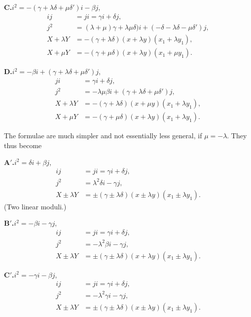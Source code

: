 \documentclass[12pt,a4paper]{article}
\begin{document}
\medskip
\textbf{C.}\quad $i^2 = -(\gamma + \lambda\delta + \mu\delta') i - \beta j$,
\begin{align*}
ij &= ji = \gamma i + \delta j,\\
j^2 &= (\lambda + \mu)\gamma + \lambda\mu\delta) i + (-\delta - \lambda\delta - \mu\delta')j,\\
X + \lambda Y &= -(\gamma + \lambda\delta)(x + \lambda y)(x_1 + \lambda y_1),\\
X + \mu Y &= -(\gamma + \mu\delta)(x + \lambda y)(x_1 + \mu y_1).
\end{align*}

\medskip
\textbf{D.}\quad $i^2 = -\beta i + (\gamma + \lambda\delta + \mu\delta')j$,
\begin{align*}
ji &= \gamma i + \delta j,\\
j^2 &= -\lambda\mu\beta i + (\gamma + \lambda\delta + \mu\delta')j,\\
X + \lambda Y &= -(\gamma + \lambda\delta)(x + \mu y)(x_1 + \lambda y_1),\\
X + \mu Y &= -(\gamma + \mu\delta)(x + \lambda y)(x_1 + \lambda y_1).
\end{align*}

\newpage
\setcounter{page}{130}

The formulae are much simpler and not essentially less general, if $\mu = -\lambda$. They
thus become

\medskip
\textbf{A$'$.}\quad $i^2 = \delta i + \beta j$,
\begin{align*}
ij &= ji = \gamma i + \delta j,\\
j^2 &= \lambda^2\delta i - \gamma j,\\
X \pm \lambda Y &= \pm (\gamma \pm \lambda\delta)(x \pm \lambda y)(x_1 \pm \lambda y_1).
\end{align*}
(Two linear moduli.)

\medskip
\textbf{B$'$.}\quad $i^2 = -\beta i - \gamma j$,
\begin{align*}
ij &= ji = \gamma i + \delta j,\\
j^2 &= -\lambda^2\beta i - \gamma j,\\
X \pm \lambda Y &= \pm (\gamma \pm \lambda\delta)(x + \lambda y)(x_1 \pm \lambda y_1).
\end{align*}

\medskip
\textbf{C$'$.}\quad $i^2 = -\gamma i - \beta j$,
\begin{align*}
ij &= ji = \gamma i + \delta j,\\
j^2 &= -\lambda^2\gamma i - \gamma j,\\
X \pm \lambda Y &= \pm (\gamma \pm \lambda\delta)(x \pm \lambda y)(x_1 \pm \lambda y_1).
\end{align*}
\end{document}
